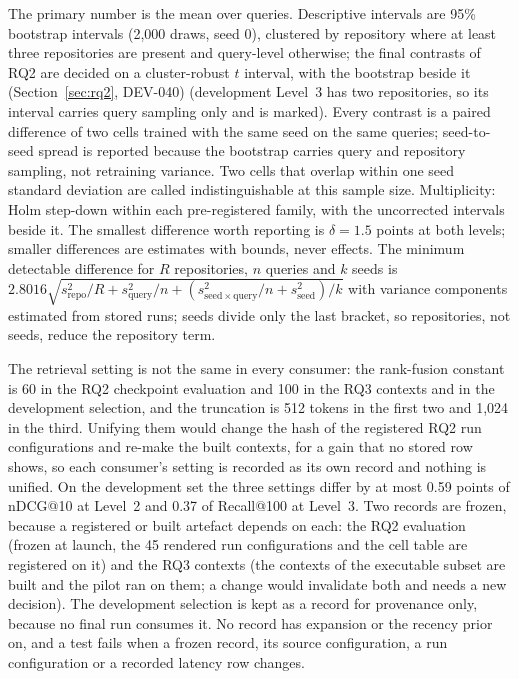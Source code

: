 \documentclass[10pt,twocolumn]{article}
\makeatletter
\renewcommand\paragraph{\@startsection{paragraph}{4}{\z@}{3pt}{-0.5em}{\normalfont\bfseries}}
\makeatother
\begin{document}
\paragraph{Statistics.} The primary number is the mean over queries. Descriptive intervals are 95\% bootstrap
intervals (2,000 draws, seed 0), %
clustered by repository where at least three repositories are
present and query-level otherwise; the final contrasts of RQ2 are decided on a cluster-robust $t$ interval, with the bootstrap beside it (Section~\ref{sec:rq2}, DEV-040) (development Level~3 has two repositories, so its interval carries
query sampling only and is marked). Every contrast is a paired difference of two cells trained with
the same seed on the same queries; seed-to-seed spread is reported because the bootstrap carries
query and repository sampling, not retraining variance. Two cells that overlap within one seed
standard deviation are called indistinguishable at this sample size. Multiplicity: Holm step-down within
each pre-registered family, with the uncorrected intervals beside it. The smallest difference worth
reporting is $\delta = 1.5$ points at both levels; %
smaller differences are estimates with bounds,
never effects. The minimum detectable difference for $R$ repositories, $n$ queries and $k$ seeds is
$2.8016\sqrt{s^2_{\mathrm{repo}}/R + s^2_{\mathrm{query}}/n + (s^2_{\mathrm{seed\times query}}/n +
s^2_{\mathrm{seed}})/k}$ with variance components estimated from stored runs; seeds divide only the
last bracket, so repositories, not seeds, reduce the repository term. %

\paragraph{Frozen settings.} The retrieval setting is not the same in every consumer: the rank-fusion constant is 60 in the RQ2 checkpoint evaluation and 100 in the RQ3 contexts and in the development selection, and the truncation is 512 tokens in the first two and 1,024 in the third. Unifying them would change the hash of the registered RQ2 run configurations and re-make the built contexts, for a gain that no stored row shows, so each consumer's setting is recorded as its own record and nothing is unified.
On the development set the three settings differ by at most 0.59 points of nDCG@10 at Level~2 and 0.37 of Recall@100 at Level~3.
Two records are frozen, because a registered or built artefact depends on each: the RQ2 evaluation (frozen at launch, the 45 rendered run configurations and the cell table are registered on it) and the RQ3 contexts (the contexts of the executable subset are built and the pilot ran on them; a change would invalidate both and needs a new decision).
The development selection is kept as a record for provenance only, because no final run consumes it. No record has expansion or the recency prior on, and a test fails when a frozen record, its source configuration, a run configuration or a recorded latency row changes.
\end{document}
